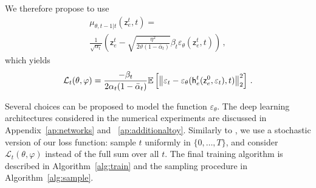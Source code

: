 \documentclass[nohyperref]{article}
\theoremstyle{plain}
\theoremstyle{definition}
\theoremstyle{remark}
\newcommand{\latentcont}{\mathsf{z}_e}
\newcommand{\latentcontpred}{\mathsf{h}_e}
\begin{document}
We therefore propose to use
\begin{multline*}
    \mu_{\theta,t-1|t}(\latentcont^{t},t) =\\%
     \frac{1}{\sqrt{\alpha_t}}\left(\latentcont^t - \sqrt{\frac{\eta^2}{2\vartheta (1-\bar{\alpha}_t)}}\beta_t\varepsilon_\theta(\latentcont^{t},t)\right)\,,
\end{multline*}
which yields
\begin{equation}
    \label{eq:hoparam}
    \mathcal{L}_t(\theta,\varphi) \\
    = \frac{-\beta_t}{2\alpha_t(1-\bar\alpha_t)}\mathbb{E}\left[\left\|\varepsilon_t - \varepsilon_\theta(\latentcontpred^t(\latentcont^{0},\varepsilon_t) ,t) \right\|_2^2\right]\,.
\end{equation}
    
Several choices can be proposed to model the function $\varepsilon_\theta$. The deep learning architectures considered in the numerical experiments are discussed in Appendix~\ref{ap:networks} and ~\ref{ap:additionaltoy}. Similarly to \cite{ho2020denoising}, we use a stochastic version of our loss function:  sample $t$ uniformly in $\{0, \ldots,  T\}$, and consider $\mathcal{L}_t(\theta,\varphi)$ instead of the full sum over all $t$. The final training algorithm is described in Algorithm~\ref{alg:train} and the sampling procedure in Algorithm~\ref{alg:sample}. 





\end{document}
